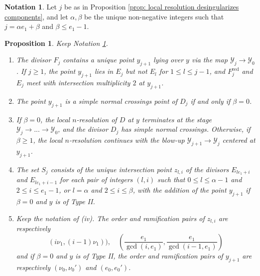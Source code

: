\documentclass[12pt]{amsart}
\numberwithin{equation}{section}
\newtheorem{prop}[equation]{Proposition}
\theoremstyle{definition}
\newtheorem{notation}[equation]{Notation}
\newcommand{\Y}{\mathcal{Y}}
\DeclareMathOperator{\red}{red}
\begin{document}
\begin{notation}\label{notation: alpha beta}
    Let $j$ be as in Proposition \ref{prop: local resolution desingularizes components}, and let $\alpha,\beta$ be the unique non-negative integers such that $j=\alpha e_1+\beta$ and $\beta\leq e_1-1$.
\end{notation}

\begin{prop}\label{prop: description of Y_j}
    Keep Notation \ref{notation: alpha beta}. 
    \begin{enumerate}[\upshape (i)]
        \item The divisor $F_j$ contains a unique point $y_{j+1}$ lying over $y$ via the map $\Y_j\to\Y_0$. If $j\geq 1$, the point $y_{j+1}$ lies in $E_j$ but not $E_l$ for $1\leq l\leq j-1$, and $F_j^{\red}$ and $E_j$ meet with intersection multiplicity $2$ at $y_{j+1}$.
        \item The point $y_{j+1}$ is a simple normal crossings point of $D_j$ if and only if $\beta=0$.
        \item If $\beta=0$, the local $n$-resolution of $D$ at $y$ terminates at the stage $\Y_j\to...\to\Y_0$, and the divisor $D_j$ has simple normal crossings. Otherwise, if $\beta\geq 1$, the local $n$-resolution continues with the blow-up $\Y_{j+1}\to\Y_j$ centered at $y_{j+1}$. 
        \item The set $S_j$ consists of the unique intersection point $z_{l,i}$ of the divisors $E_{le_1+i}$ and $E_{le_1+i-1}$ for each pair of integers $(l,i)$ such that $0\leq l\leq\alpha-1$ and $2\leq i\leq e_1-1$, or $l=\alpha$ and $2\leq i\leq \beta$, with the addition of the point $y_{j+1}$ if  $\beta=0$ and $y$ is of Type II.
        \item Keep the notation of \textup{(iv)}. The order and ramification pairs of $z_{l,i}$ are respectively \[(i\nu_1,(i-1)\nu_1)),\quad(\frac{e_1}{\gcd(i,e_1)},\frac{e_1}{\gcd(i-1,e_1)})\]
        and if $\beta=0$ and $y$ is of Type II, the order and ramification pairs of $y_{j+1}$ are respectively $(\nu_0,\nu_0')$ and $(e_0,e_0')$.
    \end{enumerate}
\end{prop}
\end{document}
